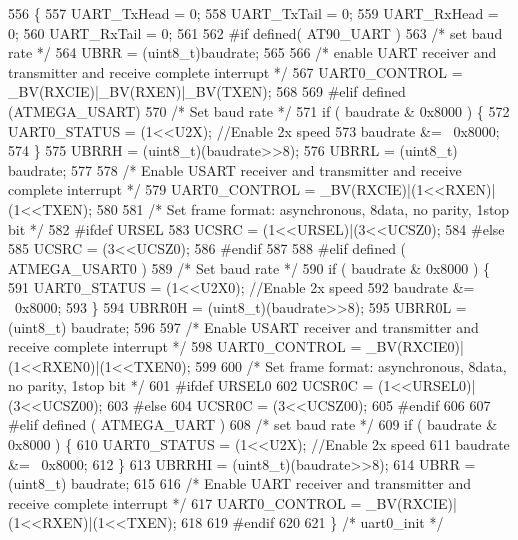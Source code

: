 \begin{DoxyCode}
556 \{
557     UART\_TxHead = 0;
558     UART\_TxTail = 0;
559     UART\_RxHead = 0;
560     UART\_RxTail = 0;
561 
562 \textcolor{preprocessor}{#if defined( AT90\_UART )}
563     \textcolor{comment}{/* set baud rate */}
564     UBRR = (uint8\_t)baudrate;
565 
566     \textcolor{comment}{/* enable UART receiver and transmitter and receive complete interrupt */}
567     UART0\_CONTROL = \_BV(RXCIE)|\_BV(RXEN)|\_BV(TXEN);
568 
569 \textcolor{preprocessor}{#elif defined (ATMEGA\_USART)}
570     \textcolor{comment}{/* Set baud rate */}
571     \textcolor{keywordflow}{if} ( baudrate & 0x8000 ) \{
572         UART0\_STATUS = (1<<U2X);  \textcolor{comment}{//Enable 2x speed}
573         baudrate &= ~0x8000;
574     \}
575     UBRRH = (uint8\_t)(baudrate>>8);
576     UBRRL = (uint8\_t) baudrate;
577 
578     \textcolor{comment}{/* Enable USART receiver and transmitter and receive complete interrupt */}
579     UART0\_CONTROL = \_BV(RXCIE)|(1<<RXEN)|(1<<TXEN);
580 
581     \textcolor{comment}{/* Set frame format: asynchronous, 8data, no parity, 1stop bit */}
582 \textcolor{preprocessor}{#ifdef URSEL}
583     UCSRC = (1<<URSEL)|(3<<UCSZ0);
584 \textcolor{preprocessor}{#else}
585     UCSRC = (3<<UCSZ0);
586 \textcolor{preprocessor}{#endif}
587 
588 \textcolor{preprocessor}{#elif defined ( ATMEGA\_USART0 )}
589     \textcolor{comment}{/* Set baud rate */}
590     \textcolor{keywordflow}{if} ( baudrate & 0x8000 ) \{
591         UART0\_STATUS = (1<<U2X0);  \textcolor{comment}{//Enable 2x speed}
592         baudrate &= ~0x8000;
593     \}
594     UBRR0H = (uint8\_t)(baudrate>>8);
595     UBRR0L = (uint8\_t) baudrate;
596 
597     \textcolor{comment}{/* Enable USART receiver and transmitter and receive complete interrupt */}
598     UART0\_CONTROL = \_BV(RXCIE0)|(1<<RXEN0)|(1<<TXEN0);
599 
600     \textcolor{comment}{/* Set frame format: asynchronous, 8data, no parity, 1stop bit */}
601 \textcolor{preprocessor}{#ifdef URSEL0}
602     UCSR0C = (1<<URSEL0)|(3<<UCSZ00);
603 \textcolor{preprocessor}{#else}
604     UCSR0C = (3<<UCSZ00);
605 \textcolor{preprocessor}{#endif}
606 
607 \textcolor{preprocessor}{#elif defined ( ATMEGA\_UART )}
608     \textcolor{comment}{/* set baud rate */}
609     \textcolor{keywordflow}{if} ( baudrate & 0x8000 ) \{
610         UART0\_STATUS = (1<<U2X);  \textcolor{comment}{//Enable 2x speed}
611         baudrate &= ~0x8000;
612     \}
613     UBRRHI = (uint8\_t)(baudrate>>8);
614     UBRR   = (uint8\_t) baudrate;
615 
616     \textcolor{comment}{/* Enable UART receiver and transmitter and receive complete interrupt */}
617     UART0\_CONTROL = \_BV(RXCIE)|(1<<RXEN)|(1<<TXEN);
618 
619 \textcolor{preprocessor}{#endif}
620 
621 \} \textcolor{comment}{/* uart0\_init */}
\end{DoxyCode}
\hypertarget{group__avr-uart_ga7f0372a14af24f02f5c6615afd6671a0}{}
